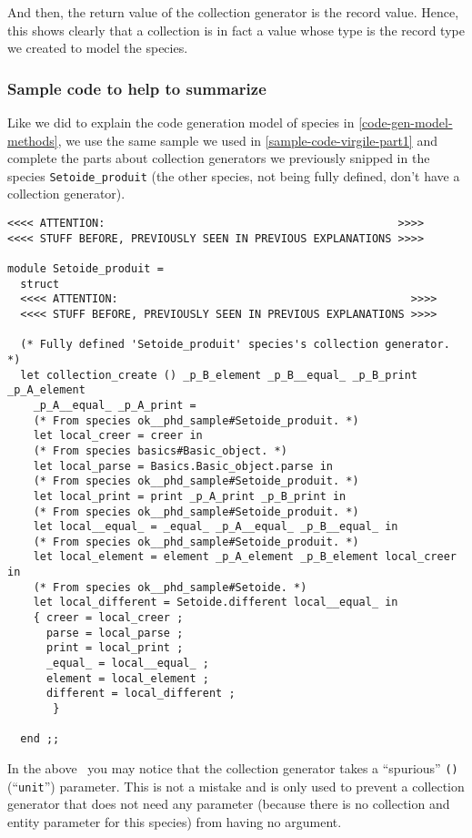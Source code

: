 And then, the return value of the collection generator is the record
value. Hence, this shows clearly that a collection is in fact a value
whose type is the record type we created to model the species.


\subsubsection{Sample code to help to summarize}
Like we did to explain the code generation model of species in
\ref{code-gen-model-methods}, we use the same sample we used in
\ref{sample-code-virgile-part1} and complete the parts about
collection generators we previously snipped in the species
{\tt Setoide\_produit} (the other species, not being fully defined,
don't have a collection generator).

{\footnotesize
\begin{lstlisting}[language=MyOCaml]
<<<< ATTENTION:                                             >>>>
<<<< STUFF BEFORE, PREVIOUSLY SEEN IN PREVIOUS EXPLANATIONS >>>>

module Setoide_produit =
  struct
  <<<< ATTENTION:                                             >>>>
  <<<< STUFF BEFORE, PREVIOUSLY SEEN IN PREVIOUS EXPLANATIONS >>>>

  (* Fully defined 'Setoide_produit' species's collection generator. *)
  let collection_create () _p_B_element _p_B__equal_ _p_B_print _p_A_element
    _p_A__equal_ _p_A_print =
    (* From species ok__phd_sample#Setoide_produit. *)
    let local_creer = creer in
    (* From species basics#Basic_object. *)
    let local_parse = Basics.Basic_object.parse in
    (* From species ok__phd_sample#Setoide_produit. *)
    let local_print = print _p_A_print _p_B_print in
    (* From species ok__phd_sample#Setoide_produit. *)
    let local__equal_ = _equal_ _p_A__equal_ _p_B__equal_ in
    (* From species ok__phd_sample#Setoide_produit. *)
    let local_element = element _p_A_element _p_B_element local_creer in
    (* From species ok__phd_sample#Setoide. *)
    let local_different = Setoide.different local__equal_ in
    { creer = local_creer ;
      parse = local_parse ;
      print = local_print ;
      _equal_ = local__equal_ ;
      element = local_element ;
      different = local_different ;
       }
    
  end ;;
\end{lstlisting}}

\label{point-the-extra-unit-parameter-need}
In the above \ocaml\ you may notice that the collection generator
takes a ``spurious'' {\tt ()} (``{\tt unit}'') parameter. This is not
a mistake and is only used to prevent a collection generator that does
not need any parameter (because there is no collection and entity
parameter for this species) from having no argument.

